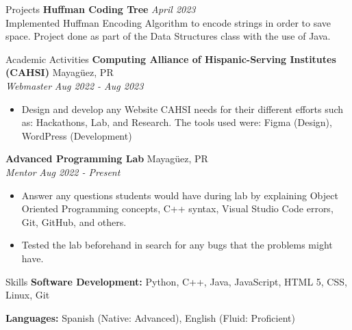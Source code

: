 \documentclass{resume} %
\begin{document}
\begin{rSection}{Projects}
{\bf Huffman Coding Tree} \hfill {\em April 2023}\\
Implemented Huffman Encoding Algorithm to encode strings in order to save space. Project done as part of the Data Structures class with the use of Java.
\end{rSection}
\begin{rSection}{Academic Activities}
{\bf Computing Alliance of Hispanic-Serving Institutes (CAHSI)} \hfill {Mayagüez, PR} 
\\
\textit{Webmaster} \hfill {\em Aug 2022 - Aug 2023}
\vspace{-0.2\baselineskip} %
\begin{itemize}[noitemsep]
    \item Design and develop any Website CAHSI needs for their different efforts such as: Hackathons, Lab, and Research. The tools used were: Figma (Design), WordPress (Development) 
\end{itemize}

{\bf Advanced Programming Lab } \hfill {Mayagüez, PR}
\\
\textit{Mentor} \hfill {\em Aug 2022 - Present}
\vspace{-0.2\baselineskip} %
\begin{itemize}[noitemsep]
    \item Answer any questions students would have during lab by explaining Object Oriented Programming concepts, C++ syntax, Visual Studio Code errors, Git, GitHub, and others.
    \item Tested the lab beforehand in search for any bugs that the problems might have. 
\end{itemize}
\end{rSection}
\begin{rSection}{Skills}
{\bf Software Development:} Python, C++, Java, JavaScript, HTML 5, CSS, Linux, Git

{\bf Languages: }Spanish (Native: Advanced), English (Fluid: Proficient)
\end{rSection}
\end{document}
